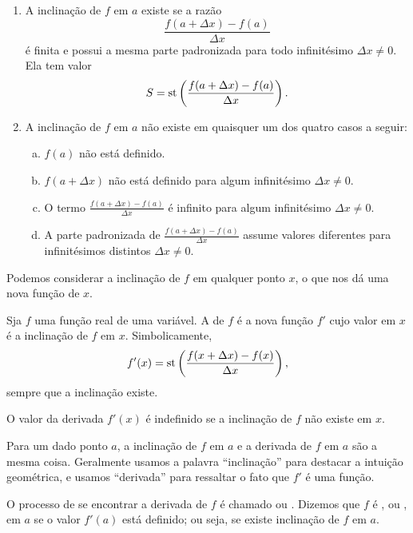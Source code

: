 \begin{enumerate}[(1)]
\item A inclinação de $f$ em $a$ existe se a razão
$$
  \frac{f(a+\Delta{x})-f(a)}{\Delta{x}}
$$
é finita e possui a mesma parte padronizada para todo infinitésimo
$\Delta{x} \ne 0$. Ela tem valor
$$
  S = \operatorname{st}\left(\frac{f(a+\Delta{x})-f(a)}{\Delta{x}}\right).
$$

\item A inclinação de $f$ em $a$ não existe em quaisquer um dos
      quatro casos a seguir:
      \begin{enumerate}[(a)]
        \item $f(a)$ não está definido.
        \item $f(a+\Delta{x})$ não está definido para algum infinitésimo
              $\Delta{x} \ne 0$.
        \item O termo $\displaystyle \frac{f(a+\Delta{x})-f(a)}{\Delta{x}}$
              é infinito para algum infinitésimo $\Delta{x} \ne 0$.
        \item A parte padronizada de $\displaystyle \frac{f(a+\Delta{x})-f(a)}{\Delta{x}}$
              assume valores diferentes para infinitésimos distintos
              $\Delta{x} \ne 0$.
      \end{enumerate}
\end{enumerate}

Podemos considerar a inclinação de $f$ em qualquer ponto $x$, o que nos
dá uma nova função de $x$.

\begin{defin}
Sja $f$ uma função real de uma variável. A  de $f$ é a
nova função $f'$ cujo valor em $x$ é a inclinação de $f$ em $x$.
Simbolicamente,
$$
  f'(x) = \operatorname{st}\left(\frac{f(x+\Delta{x})-f(x)}{\Delta{x}}\right),
$$
sempre que a inclinação existe.
\end{defin}

O valor da derivada $f'(x)$ é indefinido se a inclinação de $f$ não
existe em $x$.

Para um dado ponto $a$, a inclinação de $f$ em $a$ e a derivada de $f$ em
$a$ são a mesma coisa. Geralmente usamos a palavra ``inclinação'' para
destacar a intuição geométrica, e usamos ``derivada'' para ressaltar o
fato que $f'$ é uma função.

O processo de se encontrar a derivada de $f$ é chamado 
ou . Dizemos que $f$ é , ou
, em $a$ se o valor $f'(a)$ está definido; ou seja,
se existe inclinação de $f$ em $a$.

